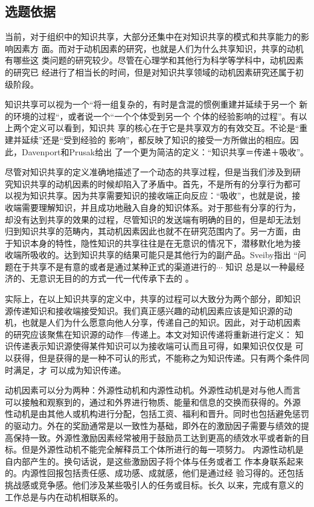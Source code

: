 \documentclass[12pt,a4paper]{ctexart}
\begin{document}
\subsection{选题依据}
当前，对于组织中的知识共享，大部分还集中在对知识共享的模式和共享能力的影响因素方
面。而对于动机因素的研究，也就是人们为什么共享知识，共享的动机有哪些这
类问题的研究较少。尽管在心理学和其他行为科学等学科中，动机因素的研究已
经进行了相当长的时间，但是对知识共享领域的动机因素研究还属于初级阶段。

知识共享可以视为一个“将一组复杂的，有时是含混的惯例重建并延续于另一个
新的环境的过程“\cite{szulanski2000pkt}，或者说一个“一个个体受到另一个
个体的经验影响的过程”\cite{Argote2000}。有以上两个定义可以看到，知识共
享的核心在于它是共享双方的有效交互。不论是“重建并延续”还是“受到经验的
影响”，都反映了知识的接受一方所做出的相应。因此，Davenport和Prusak给出
了一个更为简洁的定义：“知识共享＝传递＋吸收”\cite{davenport1998wko}。

尽管对知识共享的定义准确地描述了一个动态的共享过程，但是当我们涉及到研
究知识共享的动机因素的时候却陷入了矛盾中。首先，不是所有的分享行为都可
以视为知识共享。因为共享需要知识的接收端正向反应：“吸收”，也就是说，接
收端需要理解知识，并且成功地融入自身的知识体系。对于那些有分享的行为，
却没有达到共享的效果的过程，尽管知识的发送端有明确的目的，但是却无法划
归到知识共享的范畴内，其动机因素因此也就不在研究范围内了。另一方面，由
于知识本身的特性，隐性知识的共享往往是在无意识的情况下，潜移默化地为接
收端所吸收的。达到知识共享的结果可能只是其他行为的副产品。Sveiby指出
“问题在于共享不是有意的或者是通过某种正式的渠道进行的$\cdots$ 知识
总是以一种最经济的、无意识无目的的方式一代一代传承下去的
\cite{sveiby1996tka}。

实际上，在以上知识共享的定义中，共享的过程可以大致分为两个部分，即知识
源传递知识和接收端接受知识。我们真正感兴趣的动机因素应该是知识源的动
机，也就是人们为什么愿意向他人分享，传递自己的知识。因此，对于动机因素
的研究应该聚焦在知识源的动作---传递上。本文对知识传递将重新进行定义：
知识传递表示知识源使得某件知识可以为接收端可认而且可得，如果知识仅仅是
可以获得，但是获得的是一种不可认的形式，不能称之为知识传递。只有两个条件同时满足，才
可以成为知识传递。

动机因素可以分为两种：外源性动机和内源性动机。外源性动机是对与他人而言
可以接触和观察到的，通过和外界进行物质、能量和信息的交换而获得的。外源
性动机是由其他人或机构进行分配，包括工资、福利和晋升。同时也包括避免惩罚的驱动力。外在的奖励通常是以一致性为基础，即外在的激励因子需要与绩效的提高保持一致。外源性激励因素经常被用于鼓励员工达到更高的绩效水平或者新的目标。但是外源性动机不能完全解释员工个体所进行的每一项努力。
 内源性动机是自内部产生的。换句话说，是这些激励因子将个体与任务或者工
 作本身联系起来的。内源性回报包括责任感、成功感、成就感，他们是通过经
 验习得的。还包括挑战感或竞争感。他们涉及某些吸引人的任务或目标。长久
 以来，完成有意义的工作总是与内在动机相联系的\cite{Luthans2001}。
\end{document}
